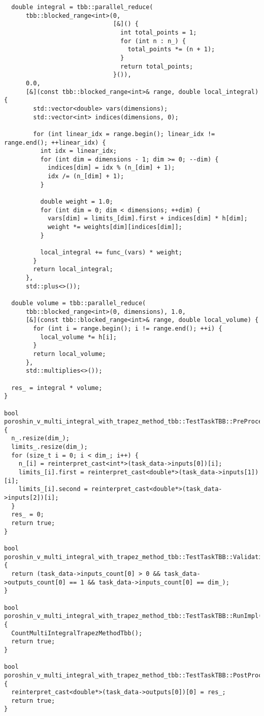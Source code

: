 \documentclass[12pt]{article}
\begin{document}
\begin{lstlisting}
  double integral = tbb::parallel_reduce(
      tbb::blocked_range<int>(0,
                              [&]() {
                                int total_points = 1;
                                for (int n : n_) {
                                  total_points *= (n + 1);
                                }
                                return total_points;
                              }()),
      0.0,
      [&](const tbb::blocked_range<int>& range, double local_integral) {
        std::vector<double> vars(dimensions);
        std::vector<int> indices(dimensions, 0);

        for (int linear_idx = range.begin(); linear_idx != range.end(); ++linear_idx) {
          int idx = linear_idx;
          for (int dim = dimensions - 1; dim >= 0; --dim) {
            indices[dim] = idx % (n_[dim] + 1);
            idx /= (n_[dim] + 1);
          }

          double weight = 1.0;
          for (int dim = 0; dim < dimensions; ++dim) {
            vars[dim] = limits_[dim].first + indices[dim] * h[dim];
            weight *= weights[dim][indices[dim]];
          }

          local_integral += func_(vars) * weight;
        }
        return local_integral;
      },
      std::plus<>());

  double volume = tbb::parallel_reduce(
      tbb::blocked_range<int>(0, dimensions), 1.0,
      [&](const tbb::blocked_range<int>& range, double local_volume) {
        for (int i = range.begin(); i != range.end(); ++i) {
          local_volume *= h[i];
        }
        return local_volume;
      },
      std::multiplies<>());

  res_ = integral * volume;
}

bool poroshin_v_multi_integral_with_trapez_method_tbb::TestTaskTBB::PreProcessingImpl() {
  n_.resize(dim_);
  limits_.resize(dim_);
  for (size_t i = 0; i < dim_; i++) {
    n_[i] = reinterpret_cast<int*>(task_data->inputs[0])[i];
    limits_[i].first = reinterpret_cast<double*>(task_data->inputs[1])[i];
    limits_[i].second = reinterpret_cast<double*>(task_data->inputs[2])[i];
  }
  res_ = 0;
  return true;
}

bool poroshin_v_multi_integral_with_trapez_method_tbb::TestTaskTBB::ValidationImpl() {
  return (task_data->inputs_count[0] > 0 && task_data->outputs_count[0] == 1 && task_data->inputs_count[0] == dim_);
}

bool poroshin_v_multi_integral_with_trapez_method_tbb::TestTaskTBB::RunImpl() {
  CountMultiIntegralTrapezMethodTbb();
  return true;
}

bool poroshin_v_multi_integral_with_trapez_method_tbb::TestTaskTBB::PostProcessingImpl() {
  reinterpret_cast<double*>(task_data->outputs[0])[0] = res_;
  return true;
}
\end{lstlisting}
\end{document}
